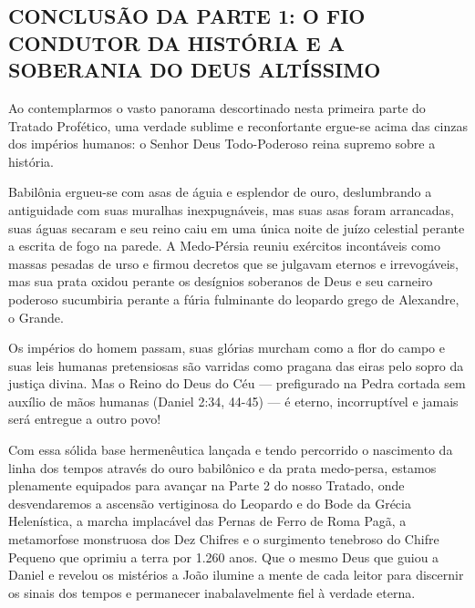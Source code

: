 \subsection{CONCLUSÃO DA PARTE 1: O FIO CONDUTOR DA HISTÓRIA E A SOBERANIA DO DEUS ALTÍSSIMO}


Ao contemplarmos o vasto panorama descortinado nesta primeira parte do Tratado Profético, uma verdade sublime e reconfortante ergue-se acima das cinzas dos impérios humanos: o Senhor Deus Todo-Poderoso reina supremo sobre a história.

Babilônia ergueu-se com asas de águia e esplendor de ouro, deslumbrando a antiguidade com suas muralhas inexpugnáveis, mas suas asas foram arrancadas, suas águas secaram e seu reino caiu em uma única noite de juízo celestial perante a escrita de fogo na parede. A Medo-Pérsia reuniu exércitos incontáveis como massas pesadas de urso e firmou decretos que se julgavam eternos e irrevogáveis, mas sua prata oxidou perante os desígnios soberanos de Deus e seu carneiro poderoso sucumbiria perante a fúria fulminante do leopardo grego de Alexandre, o Grande.

Os impérios do homem passam, suas glórias murcham como a flor do campo e suas leis humanas pretensiosas são varridas como pragana das eiras pelo sopro da justiça divina. Mas o Reino do Deus do Céu — prefigurado na Pedra cortada sem auxílio de mãos humanas (Daniel 2:34, 44-45) — é eterno, incorruptível e jamais será entregue a outro povo!

Com essa sólida base hermenêutica lançada e tendo percorrido o nascimento da linha dos tempos através do ouro babilônico e da prata medo-persa, estamos plenamente equipados para avançar na Parte 2 do nosso Tratado, onde desvendaremos a ascensão vertiginosa do Leopardo e do Bode da Grécia Helenística, a marcha implacável das Pernas de Ferro de Roma Pagã, a metamorfose monstruosa dos Dez Chifres e o surgimento tenebroso do Chifre Pequeno que oprimiu a terra por 1.260 anos. Que o mesmo Deus que guiou a Daniel e revelou os mistérios a João ilumine a mente de cada leitor para discernir os sinais dos tempos e permanecer inabalavelmente fiel à verdade eterna.
